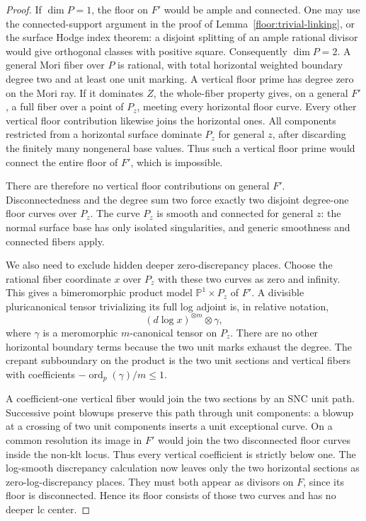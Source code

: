 \documentclass[11pt,letterpaper]{article}
\theoremstyle{definition}
\theoremstyle{remark}
\begin{document}
\begin{proof}
If $\dim P=1$, the floor on $F'$ would be
ample and connected.  One may use the
connected-support argument in the proof of
Lemma~\ref{floor:trivial-linking}, or the
surface Hodge index theorem: a disjoint
splitting of an ample rational divisor would
give orthogonal classes with positive square.
Consequently $\dim P=2$.  A general Mori
fiber over $P$ is rational, with total
horizontal weighted boundary degree two and
at least one unit marking.  A vertical floor
prime has degree zero on the Mori ray.  If
it dominates $Z$, the whole-fiber property
gives, on a general $F'$, a full fiber over
a point of $P_z$, meeting every horizontal
floor curve.  Every other vertical floor
contribution likewise joins the horizontal
ones.  All components restricted from a
horizontal surface dominate $P_z$ for
general $z$, after discarding the finitely
many nongeneral base values.  Thus such a
vertical floor prime would connect the
entire floor of $F'$, which is impossible.

There are therefore no vertical floor
contributions on general $F'$.  Disconnectedness
and the degree sum two force exactly two
disjoint degree-one floor curves over $P_z$.
The curve $P_z$ is smooth and connected for
general $z$: the normal surface base has
only isolated singularities, and generic
smoothness and connected fibers apply.

We also need to exclude hidden deeper
zero-discrepancy places.  Choose the rational
fiber coordinate $x$ over $P_z$ with these
two curves as zero and infinity.  This gives
a bimeromorphic product model
$\mathbb{P}^1\times P_z$ of $F'$.  A divisible
pluricanonical tensor trivializing its full
log adjoint is, in relative notation,
\begin{equation}
 \label{floor:surface-dlog-product}
 (d\log x)^{\otimes m}\otimes\gamma,
\end{equation}
where $\gamma$ is a meromorphic
$m$-canonical tensor on $P_z$.  There are
no other horizontal boundary terms because
the two unit marks exhaust the degree.
The crepant subboundary on the product is
the two unit sections and vertical fibers
with coefficients
$-\operatorname{ord}_p(\gamma)/m\le1$.

A coefficient-one vertical fiber would
join the two sections by an SNC unit path.
Successive point blowups preserve this
path through unit components: a blowup at
a crossing of two unit components inserts
a unit exceptional curve.  On a common
resolution its image in $F'$ would join
the two disconnected floor curves inside
the non-klt locus.  Thus every vertical
coefficient is strictly below one.  The
log-smooth discrepancy calculation now
leaves only the two horizontal sections
as zero-log-discrepancy places.  They
must both appear as divisors on $F$, since
its floor is disconnected.  Hence its
floor consists of those two curves and
has no deeper lc center.


\end{proof}
\end{document}
